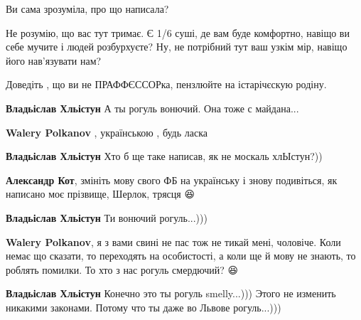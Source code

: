 \begin{itemize}
Ви сама зрозуміла, про що написала? 🤣

Не розумію, що вас тут тримає. Є 1/6 суші, де вам буде комфортно, навіщо ви
себе мучите і людей розбурхуєте? Ну, не потрібний тут ваш узкім мір, навіщо
його нав'язувати нам?

Доведіть , що ви не ПРАФФЄССОРка, пензлюйте на істарічєскую родіну.

\begin{itemize}

\textbf{Владьіслав Хльістун} А ты рогуль вонючий. Она тоже с майдана...


\textbf{Walery Polkanov} , українською , будь ласка \Smiley[1.0][yellow]


\textbf{Владьіслав Хльістун} Хто б ще таке написав, як не москаль хлЫстун?))


\textbf{Александр Кот}, змініть мову свого ФБ на українську і знову подивіться, як написано моє прізвище, Шерлок, трясця 😆


\textbf{Владьіслав Хльістун} Ти вонючий рогуль...)))


\textbf{Walery Polkanov}, я з вами свині не пас тож не тикай мені, чоловіче. Коли немає що сказати, то переходять на особистості, а коли ще й мову не знають, то роблять помилки. То хто з нас рогуль смердючий? 😆


\textbf{Владьіслав Хльістун} Конечно это ты рогуль smelly...))) Этого не изменить никакими законами. Потому что ты даже во Львове рогуль...)))


\end{itemize}
\end{itemize}

